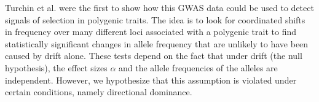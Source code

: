 \documentclass[a4paper,12pt]{article}
\begin{document}
Turchin et al. \cite{heightselection} were the first to show how this
GWAS data could be used to detect signals of selection in polygenic
traits. The idea is to look for coordinated shifts in frequency over
many different loci associated with a polygenic trait to find
statistically significant changes in allele frequency that are
unlikely to have been caused by drift alone. These tests depend on the
fact that under drift (the null hypothesis), the effect sizes $\alpha$
and the allele frequencies of the alleles are independent. However, we hypothesize that this assumption is violated
under certain conditions, namely directional dominance. 

\end{document}
